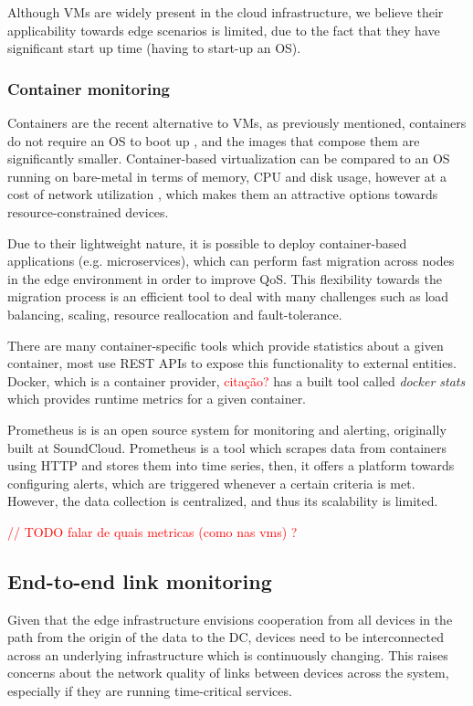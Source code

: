 Although VMs are widely present in the cloud infrastructure, we believe their applicability towards edge scenarios is limited, due to the fact that they have significant start up time (having to start-up an OS).

\subsubsection{Container monitoring}

Containers are the recent alternative to VMs, as previously mentioned, containers do not require an OS to boot up \cite{}, and the images that compose them are significantly smaller. Container-based virtualization can be compared to an OS running on bare-metal in terms of memory, CPU and disk usage, however at a cost of network utilization \cite{preeth2015evaluation}, which makes them an attractive options towards resource-constrained devices.

Due to their lightweight nature, it is possible to deploy container-based applications (e.g. microservices), which can perform fast migration across nodes in the edge environment in order to improve QoS. This flexibility towards the migration process is an efficient tool to deal with many challenges such as load balancing, scaling, resource reallocation and fault-tolerance. 

There are many container-specific tools which provide statistics about a given container, most use REST APIs to expose this functionality to external entities. Docker, which is a container provider, \textcolor{red}{citação?} has a built tool called \textit{docker stats} which provides runtime metrics for a given container.

Prometheus is is an open source system for monitoring and alerting, originally built at SoundCloud. Prometheus is a tool which scrapes data from containers using HTTP and stores them into time series, then, it offers a platform towards configuring alerts, which are triggered whenever a certain criteria is met. However, the data collection is centralized, and thus its scalability is limited. 

\textcolor{red}{// TODO falar de quais metricas (como nas vms) ? }

\subsection{End-to-end link monitoring}

Given that the edge infrastructure envisions cooperation from all devices in the path from the origin of the data to the DC, devices need to be interconnected across an underlying infrastructure which is continuously changing. This raises concerns about the network quality of links between devices across the system, especially if they are running time-critical services. 

